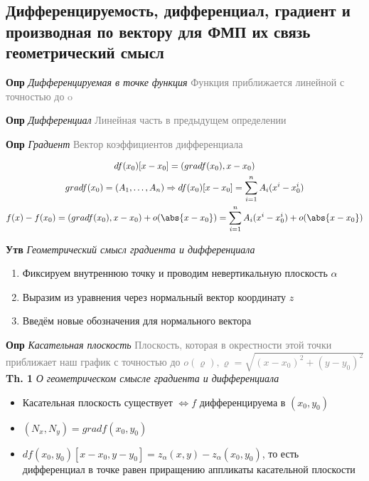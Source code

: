 \subsection{Дифференцируемость, дифференциал, градиент и производная по вектору для ФМП их связь геометрический смысл}

\textbf{Опр} \textit{Дифференцируемая в точке функция} \textcolor{gray}{Функция приближается линейной с точностью до o}

\textbf{Опр} \textit{Дифференциал} \textcolor{gray}{Линейная часть в предыдущем определении}

\textbf{Опр} \textit{Градиент} \textcolor{gray}{Вектор коэффициентов дифференциала}

\begin{gather*}
    df(x_0)[x - x_0] = (grad f(x_0), x - x_0)\\
    grad f(x_0) = (A_1, \dots, A_n) \Rightarrow df(x_0)[x - x_0] = \sum_{i=1}^{n} A_i (x^i - x_0^i)\\
    f(x) - f(x_0) = (grad f(x_0), x - x_0) + o(\abs{x - x_0}) = \sum_{i=1}^{n} A_i (x^i - x_0^i) + o(\abs{x - x_0})\\
\end{gather*}

\textbf{Утв} \textit{Геометрический смысл градиента и дифференциала}

\begin{enumerate}
    \item Фиксируем внутреннюю точку и проводим невертикальную плоскость $\alpha$
    \item Выразим из уравнения через нормальный вектор координату $z$
    \item Введём новые обозначения для нормального вектора
\end{enumerate}

\textbf{Опр} \textit{Касательная плоскость}
\textcolor{gray}{Плоскость, которая в окрестности этой точки приближает наш график с точностью до
    $o(\varrho), \varrho = \sqrt{(x - x_0)^2 + (y - y_0)^2}$} \\

\textbf{Th. 1} \textit{О геометрическом смысле градиента и дифференциала}

\begin{itemize}
    \color{blue}
    \item Касательная плоскость существует $\Leftrightarrow f$ дифференцируема в $(x_0, y_0)$
    \item $(N_x, N_y) = grad f(x_0, y_0)$
    \item $df(x_0, y_0)[x - x_0, y - y_0] = z_\alpha (x, y) - z_\alpha (x_0, y_0)$, то есть дифференциал в точке равен приращению аппликаты касательной плоскости
\end{itemize}

